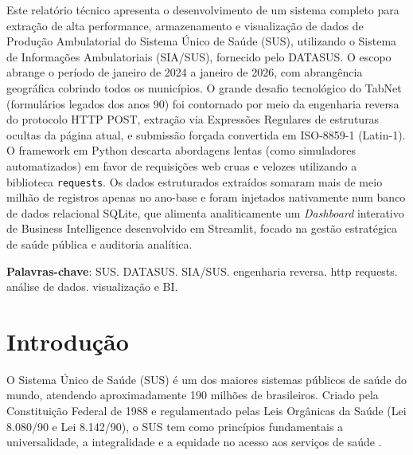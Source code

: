 \documentclass[
    12pt,
    oneside,
    a4paper,
    chapter=TITLE,
    section=TITLE
]{abntex2}
\begin{document}
\begin{resumo}

Este relatório técnico apresenta o desenvolvimento de um sistema completo para extração de alta performance, armazenamento e visualização de dados de Produção Ambulatorial do Sistema Único de Saúde (SUS), utilizando o Sistema de Informações Ambulatoriais (SIA/SUS), fornecido pelo DATASUS. O escopo abrange o período de janeiro de 2024 a janeiro de 2026, com abrangência geográfica cobrindo todos os municípios. O grande desafio tecnológico do TabNet (formulários legados dos anos 90) foi contornado por meio da engenharia reversa do protocolo HTTP POST, extração via Expressões Regulares de estruturas ocultas da página atual, e submissão forçada convertida em ISO-8859-1 (Latin-1). O framework em Python descarta abordagens lentas (como simuladores automatizados) em favor de requisições web cruas e velozes utilizando a biblioteca \texttt{requests}. Os dados estruturados extraídos somaram mais de meio milhão de registros apenas no ano-base e foram injetados nativamente num banco de dados relacional SQLite, que alimenta analiticamente um \textit{Dashboard} interativo de Business Intelligence desenvolvido em Streamlit, focado na gestão estratégica de saúde pública e auditoria analítica.

\vspace{\onelineskip}

\noindent
\textbf{Palavras-chave}: SUS. DATASUS. SIA/SUS. engenharia reversa. http requests. análise de dados. visualização e BI.

\end{resumo}

\tableofcontents*
\listoffigures*
\listoftables*

\cleardoublepage
\pagestyle{fancy}
\textual

\chapter{Introdução}

O Sistema Único de Saúde (SUS) é um dos maiores sistemas públicos de saúde do mundo, atendendo aproximadamente 190 milhões de brasileiros. Criado pela Constituição Federal de 1988 e regulamentado pelas Leis Orgânicas da Saúde (Lei 8.080/90 e Lei 8.142/90), o SUS tem como princípios fundamentais a universalidade, a integralidade e a equidade no acesso aos serviços de saúde \cite{brasil1988}.
\end{document}
